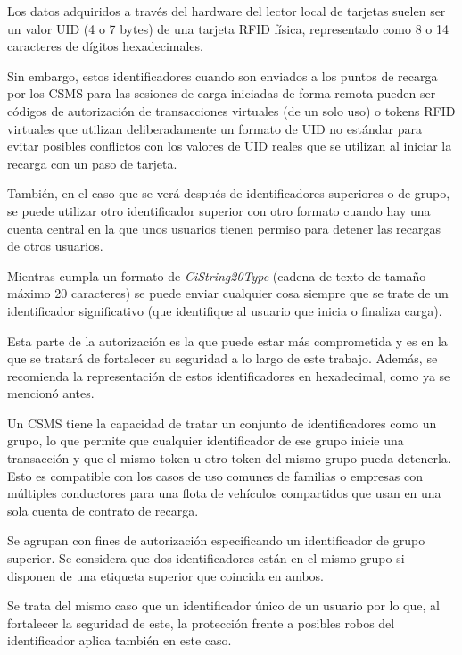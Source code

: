 \documentclass[12pt,a4paper,onecolumn,oneside]{report}
\newcounter{subsubsubsection}[subsubsection]
\begin{document}
\label{Identificadores}

Los datos adquiridos a través del hardware del lector local de tarjetas suelen ser un valor UID (4 o 7 bytes) de una tarjeta RFID física, representado como 8 o 14 caracteres de dígitos hexadecimales. 

Sin embargo, estos identificadores cuando son enviados a los puntos de recarga por los CSMS para las sesiones de carga iniciadas de forma remota pueden ser códigos de autorización de transacciones virtuales (de un solo uso) o tokens RFID virtuales que utilizan deliberadamente un formato de UID no estándar para evitar posibles conflictos con los valores de UID reales que se utilizan al iniciar la recarga con un paso de tarjeta.

También, en el caso que se verá después de identificadores superiores o de grupo, se puede utilizar otro identificador superior con otro formato cuando hay una cuenta central en la que unos usuarios tienen permiso para detener las recargas de otros usuarios.

Mientras cumpla un formato de \textit{CiString20Type} (cadena de texto de tamaño máximo 20 caracteres) se puede enviar cualquier cosa siempre que se trate de un identificador significativo (que identifique al usuario que inicia o finaliza carga).

Esta parte de la autorización es la que puede estar más comprometida y es en la que se tratará de fortalecer su seguridad a lo largo de este trabajo. Además, se recomienda la representación de estos identificadores en hexadecimal, como ya se mencionó antes.


\label{Identificadores superiores}

Un CSMS tiene la capacidad de tratar un conjunto de identificadores como un grupo, lo que permite que cualquier identificador de ese grupo inicie una transacción y que el mismo token u otro token del mismo grupo pueda detenerla. Esto es compatible con los casos de uso comunes de familias o empresas con múltiples conductores para una flota de vehículos compartidos que usan en una sola cuenta de contrato de recarga.

Se agrupan con fines de autorización especificando un identificador de grupo superior. Se considera que dos identificadores están en el mismo grupo si disponen de una etiqueta superior que coincida en ambos.

Se trata del mismo caso que un identificador único de un usuario por lo que, al fortalecer la seguridad de este, la protección frente a posibles robos del identificador aplica también en este caso.
\end{document}
